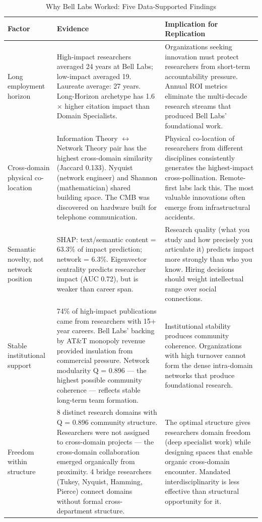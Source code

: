 \documentclass[journal]{IEEEtran}
\begin{document}
\begin{table}[htbp]
\caption{Why Bell Labs Worked: Five Data-Supported Findings}
\label{tab:why}
\centering
\begin{tabular}{p{2.2cm}p{6.5cm}p{6.5cm}}
\toprule
\textbf{Factor} & \textbf{Evidence} & \textbf{Implication for Replication} \\
\midrule
Long employment horizon &
High-impact researchers averaged 24 years at Bell Labs; low-impact averaged 19.
Laureate average: 27 years. Long-Horizon archetype has 1.6$\times$ higher
citation impact than Domain Specialists. &
Organizations seeking innovation must protect researchers from short-term
accountability pressure. Annual ROI metrics eliminate the multi-decade
research streams that produced Bell Labs' foundational work. \\
\midrule
Cross-domain physical co-location &
Information Theory $\leftrightarrow$ Network Theory pair has the highest
cross-domain similarity (Jaccard 0.133). Nyquist (network engineer) and
Shannon (mathematician) shared building space. The CMB was discovered on
hardware built for telephone communication. &
Physical co-location of researchers from different disciplines consistently
generates the highest-impact cross-pollination. Remote-first labs lack this.
The most valuable innovations often emerge from infrastructural accidents. \\
\midrule
Semantic novelty, not network position &
SHAP: text/semantic content = 63.3\% of impact prediction; network = 6.3\%.
Eigenvector centrality predicts researcher impact (AUC 0.72), but is weaker
than career span. &
Research quality (what you study and how precisely you articulate it) predicts
impact more strongly than who you know. Hiring decisions should weight
intellectual range over social connections. \\
\midrule
Stable institutional support &
74\% of high-impact publications came from researchers with 15+ year careers.
Bell Labs' backing by AT\&T monopoly revenue provided insulation from commercial
pressure. Network modularity Q = 0.896 --- the highest possible community
coherence --- reflects stable long-term team formation. &
Institutional stability produces community coherence. Organizations with
high turnover cannot form the dense intra-domain networks that produce
foundational research. \\
\midrule
Freedom within structure &
8 distinct research domains with Q = 0.896 community structure. Researchers
were not assigned to cross-domain projects --- the cross-domain collaboration
emerged organically from proximity. 4 bridge researchers (Tukey, Nyquist,
Hamming, Pierce) connect domains without formal cross-department structure. &
The optimal structure gives researchers domain freedom (deep specialist work)
while designing spaces that enable organic cross-domain encounter. Mandated
interdisciplinarity is less effective than structural opportunity for it. \\
\bottomrule
\end{tabular}
\end{table}
\end{document}
